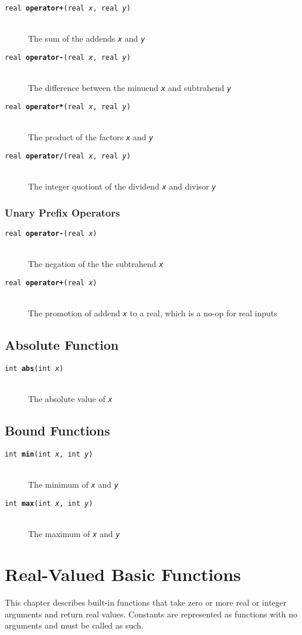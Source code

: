 \documentclass[10pt]{report}
\newcommand{\fitem}[4]{\item[{\tt #1 {\bfseries #2}(#3)}]\mbox{ } \\[4pt] #4}
\newcommand{\farg}[1]{{\tt\slshape #1}}
\begin{document}
\begin{description}
%
\fitem{real}{operator+}{real \farg{x}, real \farg{y}}{
The sum of the addends \farg{x} and \farg{y}}
%
\fitem{real}{operator-}{real \farg{x}, real \farg{y}}{
The difference between the minuend \farg{x} and subtrahend \farg{y}}
%
\fitem{real}{operator*}{real \farg{x}, real \farg{y}}{
The product of the factors \farg{x} and \farg{y}}
%
\fitem{real}{operator/}{real \farg{x}, real \farg{y}}{
The integer quotiont of the dividend \farg{x} and divisor \farg{y}}
%
\end{description}

\subsection{Unary Prefix Operators}

\begin{description}
\fitem{real}{operator-}{real \farg{x}}{
The negation of the the subtrahend \farg{x}}

\fitem{real}{operator+}{real \farg{x}}{
The promotion of addend \farg{x} to a real, which is a no-op
for real inputs}
\end{description}

\section{Absolute Function}

\begin{description}
%
\fitem{int}{abs}{int \farg{x}}{
The absolute value of \farg{x}}
%
\end{description}
%

\section{Bound Functions}
%
\begin{description}
\fitem{int}{min}{int \farg{x}, int \farg{y}}{
The minimum of \farg{x} and \farg{y}}
%
\fitem{int}{max}{int \farg{x}, int \farg{y}}{
The maximum of \farg{x} and \farg{y}}
%
\end{description}


\chapter{Real-Valued Basic Functions}

This chapter describes built-in functions that take zero or more real
or integer arguments and return real values.  Constants are
represented as functions with no arguments and must be called as such.
\end{document}
